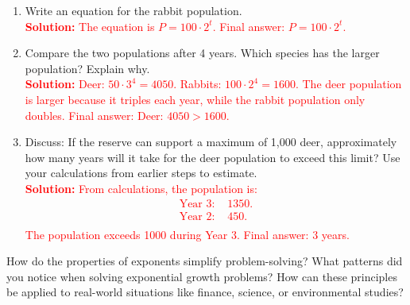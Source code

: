 \documentclass[9pt]{article}
\begin{document}
\begin{tcolorbox}
\begin{enumerate}[itemsep=3em]
    \item Write an equation for the rabbit population.\\
    \textcolor{red}{\textbf{Solution:} The equation is \(P = 100 \cdot 2^t\). Final answer: \(P = 100 \cdot 2^t\).}

    \item Compare the two populations after 4 years. Which species has the larger population? Explain why.\\
    \textcolor{red}{\textbf{Solution:} 
    Deer: \(50 \cdot 3^4 = 4050.\) 
    Rabbits: \(100 \cdot 2^4 = 1600.\) 
    The deer population is larger because it triples each year, while the rabbit population only doubles. Final answer: Deer: \(4050 > 1600\).}

    \item Discuss: If the reserve can support a maximum of 1,000 deer, approximately how many years will it take for the deer population to exceed this limit? Use your calculations from earlier steps to estimate.\\
    \textcolor{red}{\textbf{Solution:} From calculations, the population is:
    \begin{align*}
    \text{Year 3: } & 1350. \\
    \text{Year 2: } & 450. \\
    \end{align*}
    The population exceeds 1000 during Year 3. Final answer: \(3\) years.}
\end{enumerate}
\end{tcolorbox}

\begin{tcolorbox}[colframe=black!60, colback=white, 
coltitle=black, colbacktitle=black!15, fonttitle=\bfseries\Large, 
title=Reflection, halign title=center, left=10pt, right=10pt, top=10pt, bottom=80pt]
How do the properties of exponents simplify problem-solving? What patterns did you notice when solving exponential growth problems? How can these principles be applied to real-world situations like finance, science, or environmental studies?
\end{tcolorbox}
\end{document}

